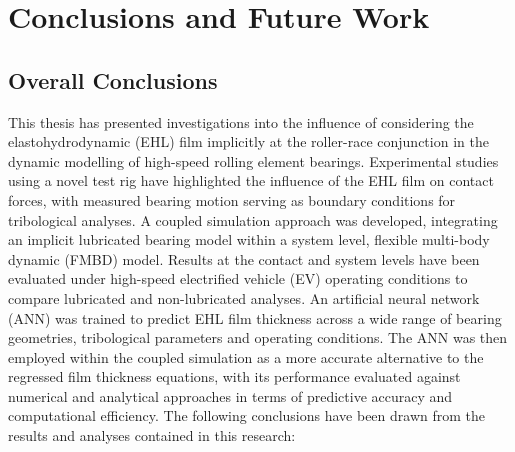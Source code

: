 \chapter{Conclusions and Future Work}
\label{Conclusions}

\section{Overall Conclusions}

This thesis has presented investigations into the influence of considering the elastohydrodynamic (EHL) film implicitly at the roller-race conjunction in the dynamic modelling of high-speed rolling element bearings. Experimental studies using a novel test rig have highlighted the influence of the EHL film on contact forces, with measured bearing motion serving as boundary conditions for tribological analyses. A coupled simulation approach was developed, integrating an implicit lubricated bearing model within a system level, flexible multi-body dynamic (FMBD) model. Results at the contact and system levels have been evaluated under high-speed electrified vehicle (EV) operating conditions to compare lubricated and non-lubricated analyses. An artificial neural network (ANN) was trained to predict EHL film thickness across a wide range of bearing geometries, tribological parameters and operating conditions. The ANN was then employed within the coupled simulation as a more accurate alternative to the regressed film thickness equations, with its performance evaluated against numerical and analytical approaches in terms of predictive accuracy and computational efficiency. The following conclusions have been drawn from the results and analyses contained in this research:

